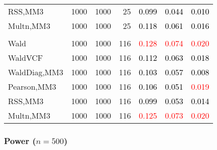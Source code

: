 \documentclass[
]{article}
\begin{document}
\begin{table}[H]
{\begin{tabular}[t]{lrrrrrr}
\hspace{1em}RSS,MM3 & 1000 & 1000 & 25 & \textcolor{black}{0.099} & \textcolor{black}{0.044} & \textcolor{black}{0.010}\\
\hspace{1em}Multn,MM3 & 1000 & 1000 & 25 & \textcolor{black}{0.118} & \textcolor{black}{0.061} & \textcolor{black}{0.016}\\
\addlinespace[0.3em]
\multicolumn{7}{l}{\textbf{3F 15V}}\\
\hspace{1em}Wald & 1000 & 1000 & 116 & \textcolor{red}{0.128} & \textcolor{red}{0.074} & \textcolor{red}{0.020}\\
\hspace{1em}WaldVCF & 1000 & 1000 & 116 & \textcolor{black}{0.112} & \textcolor{black}{0.063} & \textcolor{black}{0.018}\\
\hspace{1em}WaldDiag,MM3 & 1000 & 1000 & 116 & \textcolor{black}{0.103} & \textcolor{black}{0.057} & \textcolor{black}{0.008}\\
\hspace{1em}Pearson,MM3 & 1000 & 1000 & 116 & \textcolor{black}{0.106} & \textcolor{black}{0.051} & \textcolor{red}{0.019}\\
\hspace{1em}RSS,MM3 & 1000 & 1000 & 116 & \textcolor{black}{0.099} & \textcolor{black}{0.053} & \textcolor{black}{0.014}\\
\hspace{1em}Multn,MM3 & 1000 & 1000 & 116 & \textcolor{red}{0.125} & \textcolor{red}{0.073} & \textcolor{red}{0.020}\\
\bottomrule
\end{tabular}}
\endgroup{}
\end{table}

\hypertarget{power-n500-2}{%
\subsubsection{\texorpdfstring{Power
(\(n=500\))}{Power (n=500)}}\label{power-n500-2}}
\end{document}
